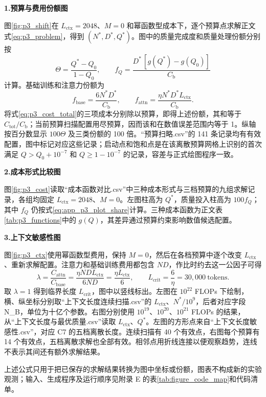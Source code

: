 \textbf{1.预算与费用份额图}\par\nopagebreak[4]
图\ref{fig:p3_shift}在 $L_{\mathrm{ctx}}=2048$、$M=0$ 和幂函数型成本下，逐个预算点求解正文式\eqref{eq:p3_problem}，得到 $(N^*,D^*,Q^*)$。图中的质量完成度和质量处理份额分别按
\begin{equation}
 \Theta=\frac{Q^*-Q_0}{1-Q_0},\qquad
 f_Q=\frac{D^*\,[g(Q^*)-g(Q_0)]}{C_{\mathrm b}}
 \label{eq:app_p3_plot_share}
\end{equation}
计算。基础训练和注意力份额为
\begin{equation}
 f_{\mathrm{base}}=\frac{6N^*D^*}{C_{\mathrm b}},\qquad
 f_{\mathrm{attn}}=\frac{\eta N^*D^*L_{\mathrm{ctx}}}{C_{\mathrm b}}.
 \label{eq:app_p3_plot_costshares}
\end{equation}
将式\eqref{eq:p3_cost_total}的三项成本分别除以预算，即得上述份额，其和等于 $C_{\mathrm{tot}}/C_{\mathrm b}$；当前预算扫描配置用尽预算，因而该和在数值误差范围内等于 1。纵轴按百分数显示 $100\Theta$ 及三类份额的 100 倍。“预算扫略.csv”的 141 条记录均有有效配置，图中标记对应这些记录；启动点和饱和点是在该离散预算网格上识别的首次满足 $Q>Q_0+10^{-7}$ 和 $Q\ge1-10^{-7}$ 的记录，容差与正式绘图程序一致。

\textbf{2.成本形式比较图}\par\nopagebreak[4]
图\ref{fig:p3_cost}读取“成本函数对比.csv”中三种成本形式与三档预算的九组求解记录，各组均固定 $L_{\mathrm{ctx}}=2048$、$M=0$。左图柱高为 $Q^*$，质量投入柱高为 $100f_Q$；其中 $f_Q$ 仍按式\eqref{eq:app_p3_plot_share}计算。三种成本函数为正文表\ref{tab:p3_functions}中的 $g(Q)$，其差异通过预算约束影响数值候选配置。

\textbf{3.上下文敏感性图}\par\nopagebreak[4]
图\ref{fig:p3_ctx}使用幂函数型费用，保持 $M=0$，然后在各档预算中逐个改变 $L_{\mathrm{ctx}}$、重新求解配置。注意力和基础训练费用都包含 $ND$，作比时约去这一公因子可得
\begin{equation}
 \lambda=\frac{C_{\mathrm{attn}}}{C_{\mathrm{base}}}=\frac{\eta ND L_{\mathrm{ctx}}}{6ND}=\frac{\eta L_{\mathrm{ctx}}}{6},
 \qquad
 L_{\mathrm{crit}}=\frac{6}{\eta}=30{,}000\ \mathrm{tokens}.
 \label{eq:app_p3_context}
\end{equation}
取 $\lambda=1$ 得到临界长度 $L_{\mathrm{crit}}$，图中以竖线标出。左图在 $10^{22}$ FLOPs 下绘制，横、纵坐标分别取“上下文长度连续扫描.csv”的 $L_{\mathrm{ctx}}$、$N^*/10^9$，后者对应字段 N\_B，单位为十亿个参数。右图分别使用 $10^{19}$、$10^{20}$、$10^{21}$ FLOPs 的结果，从“上下文长度与最优质量.csv”读取 $L_{\mathrm{ctx}}$、$Q^*$。左图的方形点来自“上下文长度敏感性.csv”，对应 C7 的五档离散长度。连续扫描有 40 个有效点，右图每个预算有 14 个有效点，五档离散求解也全部有效。相邻点用折线连接以便观察趋势，连线不表示其间还有额外求解结果。

上述公式只用于把已保存的求解结果转换为图中坐标或份额，图表不构成新的实验观测；输入、生成程序及运行顺序见附录 E 的表\ref{tab:figure_code_map}和代码清单。
